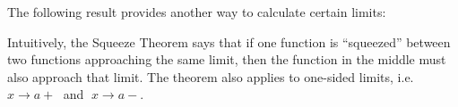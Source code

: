 The following result provides another way to calculate certain limits:


Intuitively, the Squeeze Theorem says that if one function is ``squeezed''
between two functions approaching the same limit, then the function in the
middle must also approach that limit. The theorem also applies to one-sided
limits, i.e. $x \to a+\;$ and $\;x \to a-$.

